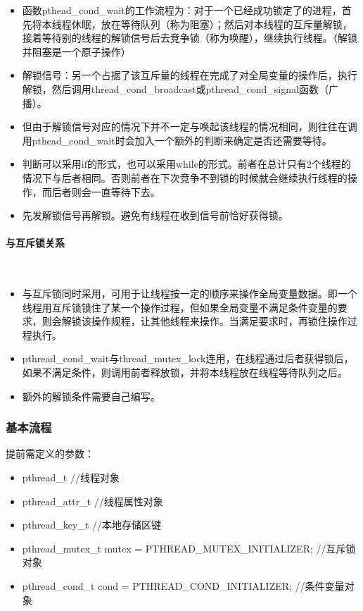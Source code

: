\documentclass[UTF8]{article}%
\begin{document}
\begin{itemize}
    \item 函数pthead\_cond\_wait的工作流程为：对于一个已经成功锁定了的进程，首先将本线程休眠，放在等待队列（称为阻塞）；然后对本线程的互斥量解锁，接着等待别的线程的解锁信号后去竞争锁（称为唤醒），继续执行线程。（解锁并阻塞是一个原子操作）
    \item 解锁信号：另一个占据了该互斥量的线程在完成了对全局变量的操作后，执行解锁，然后调用thread\_cond\_broadcast或pthread\_cond\_signal函数（广播）。
    \item 但由于解锁信号对应的情况下并不一定与唤起该线程的情况相同，则往往在调用pthead\_cond\_wait时会加入一个额外的判断来确定是否还需要等待。
    \item 判断可以采用if的形式，也可以采用while的形式。前者在总计只有2个线程的情况下与后者相同。否则前者在下次竞争不到锁的时候就会继续执行线程的操作，而后者则会一直等待下去。
    \item 先发解锁信号再解锁。避免有线程在收到信号前恰好获得锁。
\end{itemize}

\paragraph{与互斥锁关系}~{}

\begin{itemize}
    \item 与互斥锁同时采用，可用于让线程按一定的顺序来操作全局变量数据。即一个线程用互斥锁锁住了某一个操作过程，但如果全局变量不满足条件变量的要求，则会解锁该操作规程，让其他线程来操作。当满足要求时，再锁住操作过程执行。
    \item pthread\_cond\_wait与thread\_mutex\_lock连用，在线程通过后者获得锁后，如果不满足条件，则调用前者释放锁，并将本线程放在线程等待队列之后。
    \item 额外的解锁条件需要自己编写。
\end{itemize}



\subsubsection{基本流程}

提前需定义的参数：

\begin{itemize}
    \item pthread\_t  //线程对象
    \item pthread\_attr\_t  //线程属性对象
    \item pthread\_key\_t  //本地存储区键
    \item pthread\_mutex\_t mutex = PTHREAD\_MUTEX\_INITIALIZER;  //互斥锁对象
    \item pthread\_cond\_t  cond  = PTHREAD\_COND\_INITIALIZER;  //条件变量对象
\end{itemize}
\end{document}
